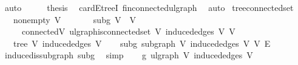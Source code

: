 \begin{isabellebody}
\ auto\isanewline
\isanewline
\ \ \isamarkupfalse%
\ \isamarkupfalse%
\ {\isacharquery}{\kern0pt}thesis\ \isamarkupfalse%
\ card{\isacharunderscore}{\kern0pt}E{\isacharunderscore}{\kern0pt}treeI\ fin{\isacharunderscore}{\kern0pt}connected{\isacharunderscore}{\kern0pt}ulgraph\ \isamarkupfalse%
\ auto\isanewline
{}\isamarkupfalse%
%
\endisatagproof
{\isafoldproof}%
%
\isadelimproof
\isanewline
%
\endisadelimproof
\isanewline
{}\isamarkupfalse%
\ tree{\isacharunderscore}{\kern0pt}connected{\isacharunderscore}{\kern0pt}set{\isacharcolon}{\kern0pt}\isanewline
\ \ \ non{\isacharunderscore}{\kern0pt}empty{\isacharcolon}{\kern0pt}\ {\isachardoublequoteopen}V{\isacharprime}{\kern0pt}\ {\isasymnoteq}\ {\isacharbraceleft}{\kern0pt}{\isacharbraceright}{\kern0pt}{\isachardoublequoteclose}\isanewline
\ \ \ \ \ subg{\isacharcolon}{\kern0pt}\ {\isachardoublequoteopen}V{\isacharprime}{\kern0pt}\ {\isasymsubseteq}\ V{\isachardoublequoteclose}\isanewline
\ \ \ \ \ connected{\isacharunderscore}{\kern0pt}V{\isacharprime}{\kern0pt}{\isacharcolon}{\kern0pt}\ {\isachardoublequoteopen}ulgraph{\isachardot}{\kern0pt}is{\isacharunderscore}{\kern0pt}connected{\isacharunderscore}{\kern0pt}set\ V{\isacharprime}{\kern0pt}\ {\isacharparenleft}{\kern0pt}induced{\isacharunderscore}{\kern0pt}edges\ V{\isacharprime}{\kern0pt}{\isacharparenright}{\kern0pt}\ V{\isacharprime}{\kern0pt}{\isachardoublequoteclose}\isanewline
\ \ \ {\isachardoublequoteopen}tree\ V{\isacharprime}{\kern0pt}\ {\isacharparenleft}{\kern0pt}induced{\isacharunderscore}{\kern0pt}edges\ V{\isacharprime}{\kern0pt}{\isacharparenright}{\kern0pt}{\isachardoublequoteclose}\isanewline
%
\isadelimproof
%
\endisadelimproof
%
\isatagproof
{}\isamarkupfalse%
{\isacharminus}{\kern0pt}\isanewline
\ \ \isamarkupfalse%
\ subg{\isacharcolon}{\kern0pt}\ subgraph\ V{\isacharprime}{\kern0pt}\ {\isachardoublequoteopen}induced{\isacharunderscore}{\kern0pt}edges\ V{\isacharprime}{\kern0pt}{\isachardoublequoteclose}\ V\ E\ \isamarkupfalse%
\ induced{\isacharunderscore}{\kern0pt}is{\isacharunderscore}{\kern0pt}subgraph\ subg\ \isamarkupfalse%
\ simp\isanewline
\ \ \isamarkupfalse%
\ g{\isacharprime}{\kern0pt}{\isacharcolon}{\kern0pt}\ ulgraph\ V{\isacharprime}{\kern0pt}\ {\isachardoublequoteopen}induced{\isacharunderscore}{\kern0pt}edges\ V{\isacharprime}{\kern0pt}{\isachardoublequoteclose}\ \isamarkupfalse%

\end{isabellebody}
